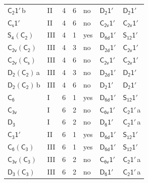 \documentclass[10pt,a4paper]{article}
\numberwithin{equation}{section}
\newcommand{\grp}[1]{\mathsf{#1}}
\newcommand{\clsletter}[1]{\,{\scriptsize\color{black!55}#1}}
\begin{document}
{\begin{longtable}{@{}llrrlll@{}}
\href{C2-1p.pdf}{$\grp{C_{2}1'}$}\clsletter{b} & II & 4 & 6 & no & \href{D2-1p.pdf}{$\grp{D_{2}1'}$} & \href{D2-1p.pdf}{$\grp{D_{2}1'}$}\\
\href{C1v-1p.pdf}{$\grp{C_{s}1'}$} & II & 4 & 6 & no & \href{C2v-1p.pdf}{$\grp{C_{2v}1'}$} & \href{C2v-1p.pdf}{$\grp{C_{2v}1'}$}\\
\href{S4-C2.pdf}{$\grp{S_{4}}(\grp{C_{2}})$} & III & 4 & 1 & yes & \href{D6d-1p.pdf}{$\grp{D_{6d}1'}$} & \href{S12-1p.pdf}{$\grp{S_{12}1'}$}\\
\href{C2v-C2.pdf}{$\grp{C_{2v}}(\grp{C_{2}})$} & III & 4 & 3 & no & \href{D2d-1p.pdf}{$\grp{D_{2d}1'}$} & \href{C2v-1p.pdf}{$\grp{C_{2v}1'}$}\\
\href{C2v-C1v.pdf}{$\grp{C_{2v}}(\grp{C_{s}})$} & III & 4 & 6 & no & \href{C2v-1p.pdf}{$\grp{C_{2v}1'}$} & \href{C2v-1p.pdf}{$\grp{C_{2v}1'}$}\\
\href{D2-C2.pdf}{$\grp{D_{2}}(\grp{C_{2}})$}\clsletter{a} & III & 4 & 3 & no & \href{D2d-1p.pdf}{$\grp{D_{2d}1'}$} & \href{D2-1p.pdf}{$\grp{D_{2}1'}$}\\
\href{D2-C2.pdf}{$\grp{D_{2}}(\grp{C_{2}})$}\clsletter{b} & III & 4 & 6 & no & \href{D2-1p.pdf}{$\grp{D_{2}1'}$} & \href{D2-1p.pdf}{$\grp{D_{2}1'}$}\\
\href{../../../rotation/data/pdf/C6.pdf}{$\grp{C_{6}}$} & I & 6 & 1 & yes & \href{D6d-1p.pdf}{$\grp{D_{6d}1'}$} & \href{S12-1p.pdf}{$\grp{S_{12}1'}$}\\
\href{../../../rotation/data/pdf/C3v.pdf}{$\grp{C_{3v}}$} & I & 6 & 2 & no & \href{C6v-1p.pdf}{$\grp{C_{6v}1'}$} & \href{C2-1p.pdf}{$\grp{C_{2}1'}$}\clsletter{a}\\
\href{../../../rotation/data/pdf/D3.pdf}{$\grp{D_{3}}$} & I & 6 & 2 & no & \href{D6-1p.pdf}{$\grp{D_{6}1'}$} & \href{C2-1p.pdf}{$\grp{C_{2}1'}$}\clsletter{a}\\
\href{C3-1p.pdf}{$\grp{C_{3}1'}$} & II & 6 & 1 & yes & \href{D6d-1p.pdf}{$\grp{D_{6d}1'}$} & \href{S12-1p.pdf}{$\grp{S_{12}1'}$}\\
\href{C6-C3.pdf}{$\grp{C_{6}}(\grp{C_{3}})$} & III & 6 & 1 & yes & \href{D6d-1p.pdf}{$\grp{D_{6d}1'}$} & \href{S12-1p.pdf}{$\grp{S_{12}1'}$}\\
\href{C3v-C3.pdf}{$\grp{C_{3v}}(\grp{C_{3}})$} & III & 6 & 2 & no & \href{C6v-1p.pdf}{$\grp{C_{6v}1'}$} & \href{C2-1p.pdf}{$\grp{C_{2}1'}$}\clsletter{a}\\
\href{D3-C3.pdf}{$\grp{D_{3}}(\grp{C_{3}})$} & III & 6 & 2 & no & \href{D6-1p.pdf}{$\grp{D_{6}1'}$} & \href{C2-1p.pdf}{$\grp{C_{2}1'}$}\clsletter{a}\\

\end{longtable}}
\end{document}
